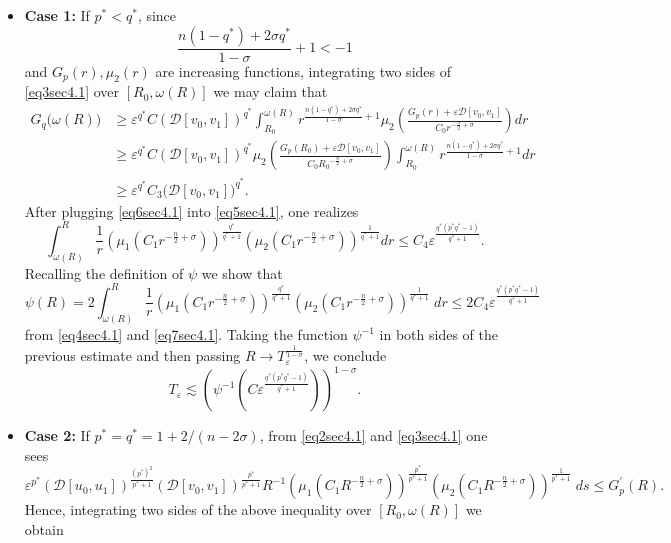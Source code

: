\documentclass[11pt,reqno]{amsart}
\newcommand{\tron}[1]{\left( #1 \right)}
\numberwithin{equation}{section}
\theoremstyle{plain}
\begin{document}
\begin{itemize}
    \item \textbf{Case 1:} If $p^*<q^*$, since
    $$\frac{n(1-q^*)+ 2\sigma q^*}{1-\sigma}+1<-1$$
and $G_p(r),\mu_2(r)$ are increasing functions, integrating two sides of \eqref{eq3sec4.1} over $[R_0,\omega(R)]$ we may claim that
\begin{align}
G_q\big(\omega(R)\big)&\geq \varepsilon^{q^*}C(\mathcal{D}[v_0,v_1])^{q^*}\int_{R_0}^{\omega(R)} r^{\frac{n(1-q^*)+ 2\sigma q^*}{1-\sigma}+1}\mu_2\left(\frac{G_p(r)+\varepsilon \mathcal{D}[v_0,v_1]}{C_0 r^{-\frac{n}{2}+\sigma}}\right)dr \nonumber\\
&\geq \varepsilon^{q^*}C(\mathcal{D}[v_0,v_1])^{q^*}\mu_2\left(\frac{G_p(R_0)+\varepsilon \mathcal{D}[v_0,v_1]}{C_0 {R_0}^{-\frac{n}{2}+\sigma}}\right)\int_{R_0}^{\omega(R)} r^{\frac{n(1-q^*)+ 2\sigma q^*}{1-\sigma}+1}dr \nonumber\\
&\geq \varepsilon^{q^*}C_3\big(\mathcal{D}[v_0,v_1]\big)^{q^*}. \label{eq6sec4.1}
\end{align}
After plugging \eqref{eq6sec4.1} into \eqref{eq5sec4.1}, one realizes
\begin{equation}\label{eq7sec4.1}
\int_{\omega(R)}^{R} \frac{1}{r}\left(\mu_1\left(C_1 r^{-\frac{n}{2}+\sigma}\right)\right)^{\frac{q^*}{q^*+1}}\left(\mu_2\left(C_1 r^{-\frac{n}{2}+\sigma}\right)\right)^{\frac{1}{q^*+1}} d r\leq C_4 \varepsilon^{\frac{q^*(p^*q^*-1)}{q^*+1}}.
\end{equation}
Recalling the definition of $\psi$ we show that
\[
\psi(R)=2\int_{\omega(R)}^{R} \frac{1}{r}\left(\mu_1\left(C_1 r^{-\frac{n}{2}+\sigma}\right)\right)^{\frac{q^*}{q^*+1}}\left(\mu_2\left(C_1 r^{-\frac{n}{2}+\sigma}\right)\right)^{\frac{1}{q^*+1}}\;dr\leq 2C_4\varepsilon^{\frac{q^*(p^*q^*-1)}{q^*+1}}
\]
from \eqref{eq4sec4.1} and \eqref{eq7sec4.1}. Taking the function $\psi^{-1}$ in both sides of the previous estimate and then passing $R\to T_{\varepsilon}^{\frac{1}{1-\sigma}}$, we conclude
\[
T_{\varepsilon}\lesssim \tron{\psi^{-1}\tron{C\varepsilon^{\frac{q^*(p^*q^*-1)}{q^*+1}}}}^{1-\sigma}.
\]
    \item \textbf{Case 2:} If $p^*=q^*=1+2/(n-2\sigma)$, from \eqref{eq2sec4.1} and \eqref{eq3sec4.1} one sees
\[
\varepsilon^{p^*}\left(\mathcal{D}[u_0,u_1]\right)^{\frac{(p^*)^2}{p^*+1}}\left(\mathcal{D}[v_0,v_1]\right)^{\frac{p^*}{p^*+1}}R^{-1}\tron{\mu_1\tron{C_1R^{-\frac{n}{2}+\sigma}}}^{\frac{p^*}{p^*+1}}\tron{\mu_2\tron{C_1R^{-\frac{n}{2}+\sigma}}}^{\frac{1}{p^*+1}}\;ds\leq G^{\prime}_{p}(R).
\]
Hence, integrating two sides of the above inequality over $[R_0,\omega(R)]$ we obtain

\end{itemize}
\end{document}
